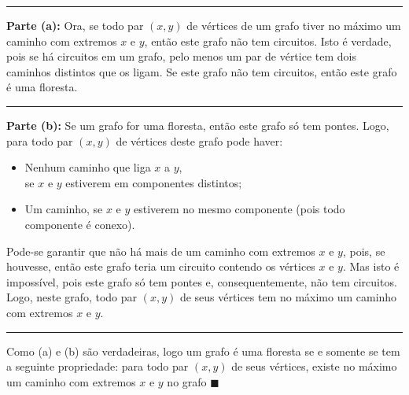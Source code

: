 \documentclass[12pt,a4paper,oneside]{article}
\begin{document}
\begin{enumerate}
{		\noindent\rule{12cm}{0.4pt}
		
		{\bf Parte (a):} Ora, se todo par $(x, y)$ de vértices de um grafo tiver no máximo um caminho com extremos $x$ e $y$, então este grafo não tem circuitos. Isto é verdade, pois se há circuitos em um grafo, pelo menos um par de vértice tem dois caminhos distintos que os ligam. Se este grafo não tem circuitos, então este grafo é uma floresta.
		
		\noindent\rule{12cm}{0.4pt}
		
		{\bf Parte (b):} Se um grafo for uma floresta, então este grafo só tem pontes. Logo, para todo par $(x, y)$ de vértices deste grafo pode haver:
		\begin{itemize}
			\item Nenhum caminho que liga $x$ a $y$, \\se $x$ e $y$ estiverem em componentes distintos;
			\item Um caminho, se $x$ e $y$ estiverem no mesmo componente (pois todo componente é conexo).
		\end{itemize}
		Pode-se garantir que não há mais de um caminho com extremos $x$ e $y$, pois, se houvesse, então este grafo teria um circuito contendo os vértices $x$ e $y$. Mas isto é impossível, pois este grafo só tem pontes e, consequentemente, não tem circuitos. Logo, neste grafo, todo par $(x, y)$ de seus vértices tem no máximo um caminho com extremos $x$ e $y$.
		
		\noindent\rule{12cm}{0.4pt}		
		
		Como (a) e (b) são verdadeiras, logo um grafo é uma floresta se e somente se tem a seguinte propriedade: para todo par $(x, y)$ de seus vértices, existe no máximo um caminho com extremos $x$ e $y$ no grafo $\blacksquare$
	}
	
	\end{enumerate}
\end{document}
